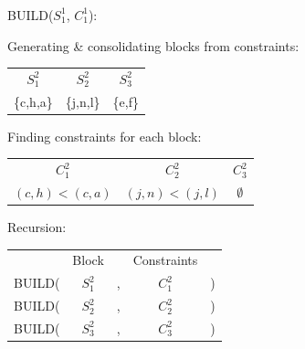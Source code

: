 \documentclass[11pt]{article} %
\begin{document}
\subsubsection{}

	\hspace{0.5cm}BUILD($S_1^1$, $C_1^1$):
		\begin{center}
		Generating \& consolidating blocks from constraints:
		
		\begin{tabular}{c c c}
			\hspace{0.8cm}$S_1^2$\hspace{0.8cm} & \hspace{0.8cm}$S_2^2$\hspace{0.8cm} & \hspace{0.8cm}$S_3^2$\hspace{0.8cm} \\
			\{c,h,a\} & \{j,n,l\} & \{e,f\}
		\end{tabular}
	
		Finding constraints for each block:
		
		\begin{tabular}{c c c}
			\hspace{0.8cm}$C_1^2$\hspace{0.8cm} & \hspace{0.8cm}$C_2^2$\hspace{0.8cm} & \hspace{0.8cm}$C_3^2$\hspace{0.8cm} \\
			$(c,h)<(c,a)$ & $(j,n)<(j,l)$ & $\emptyset$
		\end{tabular}

		Recursion:
		
		\begin{tabular}{c c c c c}
			 & Block & & Constraints & \\
			BUILD( & $S_1^2$ & , & $C_1^2$ & ) \\
			BUILD( & $S_2^2$ & , & $C_2^2$ & ) \\
			BUILD( & $S_3^2$ & , & $C_3^2$ & )
		\end{tabular}
		\end{center}
\end{document}
